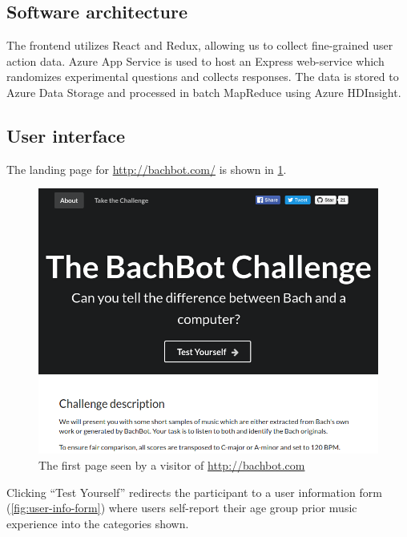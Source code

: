 \subsection{Software architecture}

The frontend utilizes React and Redux, allowing us to collect fine-grained user
action data. Azure App Service is used to host an Express web-service which
randomizes experimental questions and collects responses. The data is stored to
Azure Data Storage and processed in batch MapReduce using Azure HDInsight.

\subsection{User interface}


The landing page for \url{http://bachbot.com/} is shown in \cref{fig:bachbot-front-page}.

\begin{figure}[tb]
  \centering
  \includegraphics[width=1.0\linewidth]{bachbot-front-page.png}
  \caption{The first page seen by a visitor of \url{http://bachbot.com}}
  \label{fig:bachbot-front-page}
\end{figure}

Clicking ``Test Yourself'' redirects the participant to a user information form
(\cref{fig:user-info-form}) where users self-report their age
group prior music experience into the categories shown.

